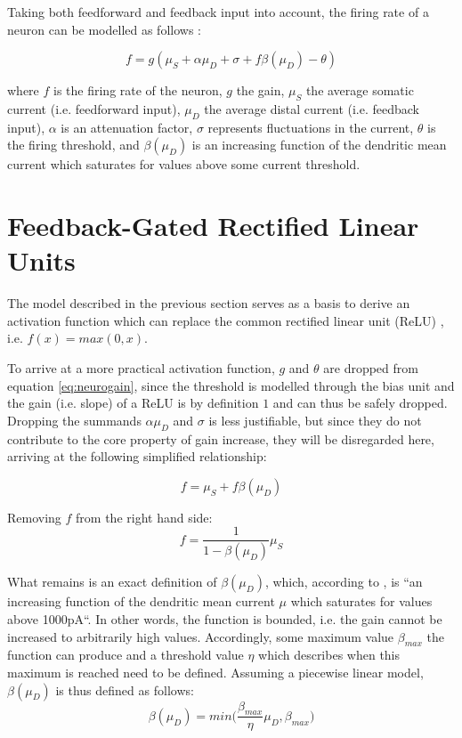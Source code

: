 \documentclass{article}
\begin{document}
Taking both feedforward and feedback input into account, the firing rate of a neuron can be modelled as follows \cite{larkum2004}:

\begin{equation} 
	\label{eq:neurogain}
	f = g(\mu_S + \alpha \mu_D + \sigma + f\beta(\mu_D)-\theta)
\end{equation}

where $f$ is the firing rate of the neuron, $g$ the gain, $\mu_S$ the average somatic current (i.e. feedforward input), $\mu_D$ the average distal current (i.e. feedback input), $\alpha$ is an attenuation factor, $\sigma$ represents fluctuations in the current, $\theta$ is the firing threshold, and $\beta(\mu_D)$ is an increasing function of the dendritic mean current which saturates for values above some current threshold.  

\section{Feedback-Gated Rectified Linear Units} 
The model described in the previous section serves as a basis to derive an activation function which can replace the common rectified linear unit (ReLU) \cite{nair2010rectified}, i.e. $f(x) = max(0, x)$.  

To arrive at a more practical activation function, $g$ and $\theta$ are dropped from equation \ref{eq:neurogain}, since the threshold is modelled through the bias unit and the gain (i.e. slope) of a ReLU is by definition $1$ and can thus be safely dropped. Dropping the summands $\alpha \mu_D$ and $\sigma$ is less justifiable, but since they do not contribute to the core property of gain increase, they will be disregarded here, arriving at the following simplified relationship: 

\begin{equation}
	f = \mu_S + f\beta(\mu_D)
\end{equation}

Removing $f$ from the right hand side: 
\begin{equation} 
\label{eq:rate1}
	f = \frac{1}{1 - \beta(\mu_D)} \mu_S
\end{equation}

What remains is an exact definition of $\beta(\mu_D)$, which, according to \cite{larkum2004}, is ``an increasing function of the dendritic mean current $\mu$ which saturates for values above 1000pA``. In other words, the function is bounded, i.e. the gain cannot be increased to arbitrarily high values. Accordingly, some maximum value $\beta_{max}$ the function can produce and a threshold value $\eta$ which describes when this maximum is reached need to be defined. 
Assuming a piecewise linear model, $\beta(\mu_D)$ is thus defined as follows: 
\begin{equation}
\label{eq:betafunc}
	\beta(\mu_D) = min \bigg(\frac{\beta_{max}}{\eta} \mu_D, \beta_{max}\bigg)
\end{equation} 
\end{document}

